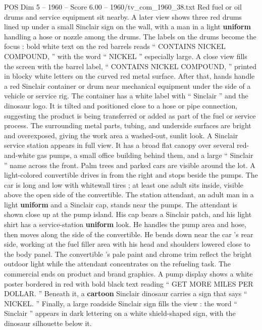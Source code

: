 \begin{textsample}{POS Dim 5 – 1960 – Score 6.00 – 1960/tv\_com\_1960\_38.txt}
Red fuel or oil drums and service equipment sit nearby.
A later view shows three red drums lined up under a small Sinclair sign on the wall, with a man in a light \textbf{uniform} handling a hose or nozzle among the drums.
The labels on the drums become the focus : bold white text on the red barrels reads “ CONTAINS NICKEL COMPOUND, ” with the word “ NICKEL ” especially large.
A close view fills the screen with the barrel label, “ CONTAINS NICKEL COMPOUND, ” printed in blocky white letters on the curved red metal surface.
After that, hands handle a red Sinclair container or drum near mechanical equipment under the side of a vehicle or service rig.
The container has a white label with “ Sinclair ” and the dinosaur logo.
It is tilted and positioned close to a hose or pipe connection, suggesting the product is being transferred or added as part of the fuel or service process.
The surrounding metal parts, tubing, and underside surfaces are bright and overexposed, giving the work area a washed-out, sunlit look.
A Sinclair service station appears in full view.
It has a broad flat canopy over several red-and-white gas pumps, a small office building behind them, and a large “ Sinclair ” name across the front.
Palm trees and parked cars are visible around the lot.
A light-colored convertible drives in from the right and stops beside the pumps.
The car is long and low with whitewall tires ; at least one adult sits inside, visible above the open side of the convertible.
The station attendant, an adult man in a light \textbf{uniform} and a Sinclair cap, stands near the pumps.
The attendant is shown close up at the pump island.
His cap bears a Sinclair patch, and his light shirt has a service-station \textbf{uniform} look.
He handles the pump area and hose, then moves along the side of the convertible.
He bends down near the car ’s rear side, working at the fuel filler area with his head and shoulders lowered close to the body panel.
The convertible ’s pale paint and chrome trim reflect the bright outdoor light while the attendant concentrates on the refueling task.
The commercial ends on product and brand graphics.
A pump display shows a white poster bordered in red with bold black text reading “ GET MORE MILES PER DOLLAR. ” Beneath it, a \textbf{cartoon} Sinclair dinosaur carries a sign that says “ NICKEL. ” Finally, a large roadside Sinclair sign fills the view : the word “ Sinclair ” appears in dark lettering on a white shield-shaped sign, with the dinosaur silhouette below it.

\end{textsample}
